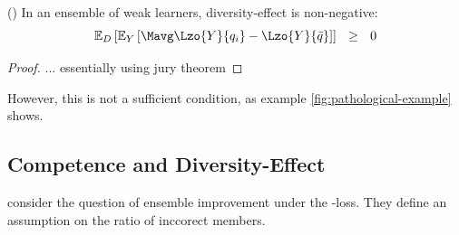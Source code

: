 \documentclass[../main.tex]{subfiles}
\begin{document}
\begin{theorem} 
    \label{thm:weak-learner-ensembles-nonnegative}
    (\cite{wood23}) In an ensemble of weak learners, diversity-effect is non-negative:
$$
\mathbb{E}_{D}\left[ 
\mathbb{E}_{Y}\left[ 
\Mavg \Lzo{Y}{q_{i}} - \Lzo{Y}{\bar{q}}
\right] 
\right] 
~ ~ \geq ~ ~ 0
$$
\end{theorem}
\begin{proof}
... essentially using jury theorem
\end{proof}


However, this is not a sufficient 
condition, as example \ref{fig:pathological-example} shows.
%

\subsection{Competence and Diversity-Effect}

\cite{theisen} consider the question of ensemble improvement under the \zeroone-loss. They define an assumption on the ratio of inccorect members.
\end{document}
